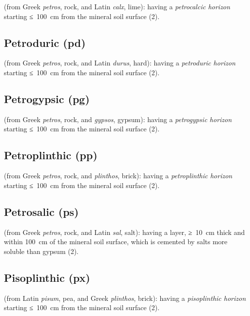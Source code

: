\documentclass[
  letterpaper,
  DIV=11,
  numbers=noendperiod]{scrreprt}
\begin{document}
(from Greek \emph{petros}, rock, and Latin \emph{calx}, lime): having a
\emph{petrocalcic horizon} starting ≤~100~cm from the mineral soil
surface (2).

\hypertarget{petroduric-pd}{%
\subsection{Petroduric (pd)}\label{petroduric-pd}}

(from Greek \emph{petros}, rock, and Latin \emph{durus}, hard): having a
\emph{petroduric horizon} starting ≤~100~cm from the mineral soil
surface (2).

\hypertarget{petrogypsic-pg}{%
\subsection{Petrogypsic (pg)}\label{petrogypsic-pg}}

(from Greek \emph{petros}, rock, and \emph{gypsos}, gypsum): having a
\emph{petrogypsic horizon} starting ≤~100~cm from the mineral soil
surface (2).

\hypertarget{petroplinthic-pp}{%
\subsection{Petroplinthic (pp)}\label{petroplinthic-pp}}

(from Greek \emph{petros}, rock, and \emph{plinthos}, brick): having a
\emph{petroplinthic horizon} starting ≤~100~cm from the mineral soil
surface (2).

\hypertarget{petrosalic-ps}{%
\subsection{Petrosalic (ps)}\label{petrosalic-ps}}

(from Greek \emph{petros}, rock, and Latin \emph{sal}, salt): having a
layer, ≥~10~cm thick and within 100~cm of the mineral soil surface,
which is cemented by salts more soluble than gypsum (2).

\hypertarget{pisoplinthic-px}{%
\subsection{Pisoplinthic (px)}\label{pisoplinthic-px}}

(from Latin \emph{pisum}, pea, and Greek \emph{plinthos}, brick): having
a \emph{pisoplinthic horizon} starting ≤~100~cm from the mineral soil
surface (2).
\end{document}
